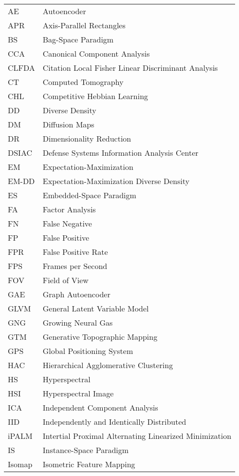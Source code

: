 \begin{longtable}{l p{5in}} %

AE & Autoencoder\\
APR & Axis-Parallel Rectangles\\
BS & Bag-Space Paradigm\\
CCA & Canonical Component Analysis\\
CLFDA &  Citation Local Fisher Linear Discriminant Analysis\\
CT & Computed Tomography\\
CHL & Competitive Hebbian Learning\\
DD & Diverse Density\\
DM & Diffusion Maps\\
DR & Dimensionality Reduction\\
DSIAC & Defense Systems Information Analysis Center\\
EM & Expectation-Maximization\\
EM-DD & Expectation-Maximization Diverse Density\\
ES & Embedded-Space Paradigm\\
FA & Factor Analysis\\
FN & False Negative\\
FP & False Positive\\ 
FPR & False Positive Rate\\
FPS & Frames per Second\\
FOV & Field of View\\
GAE & Graph Autoencoder\\
GLVM & General Latent Variable Model\\
GNG & Growing Neural Gas\\
GTM & Generative Topographic Mapping\\
GPS & Global Positioning System\\
HAC & Hierarchical Agglomerative Clustering\\
HS & Hyperspectral\\
HSI & Hyperspectral Image\\
ICA & Independent Component Analysis\\
IID & Independently and Identically Distributed\\
iPALM & Intertial Proximal Alternating Linearized Minimization\\
IS & Instance-Space Paradigm\\
Isomap & Isometric Feature Mapping\\

\end{longtable}
